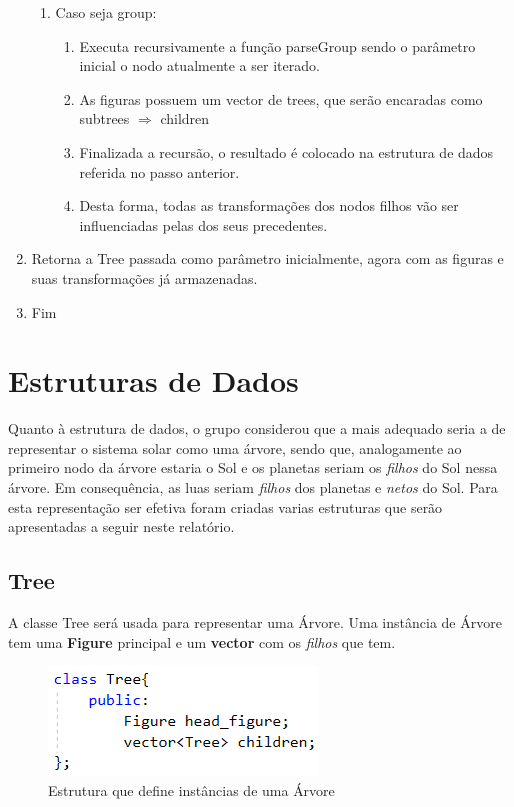 \documentclass[a4paper]{article}
\begin{document}
\begin{enumerate}
\begin{enumerate}
    \item Caso seja group:
      \begin{enumerate}
        \item Executa recursivamente a função parseGroup sendo o parâmetro inicial o nodo atualmente a ser iterado.
        \item As figuras possuem um vector de trees, que serão encaradas como subtrees $\Rightarrow$ children
        \item Finalizada a recursão, o resultado é colocado na estrutura de dados referida no passo anterior.
        \item Desta forma, todas as transformações dos nodos filhos vão ser influenciadas pelas dos seus precedentes.
      \end{enumerate}

  \end{enumerate}

  \item Retorna a Tree passada como parâmetro inicialmente, agora com as figuras e suas transformações já armazenadas.
  \item Fim
\end{enumerate}
\rmfamily


\newpage

\section{Estruturas de Dados}
\label{sec:estruturas}
Quanto à estrutura de dados, o grupo considerou que a mais adequado seria a de representar o sistema solar como uma árvore, sendo que, analogamente ao primeiro nodo da árvore estaria o Sol e os planetas seriam os \textit{filhos} do Sol nessa árvore. Em consequência, as luas seriam \textit{filhos} dos planetas e \textit{netos} do Sol.  Para esta representação ser efetiva foram criadas varias estruturas que serão apresentadas a seguir neste relatório.


\subsection{Tree}
\label{sec:tree}

A classe Tree será usada para representar uma Árvore. Uma instância de Árvore tem uma \textbf{Figure} principal e um \textbf{vector} com os \textit{filhos} que tem.

\begin{figure}[H]
\centering
\includegraphics[scale=0.8]{tree.png}
\caption{Estrutura que define instâncias de uma Árvore}
\label{img:Tree}
\end{figure}
\end{document}
